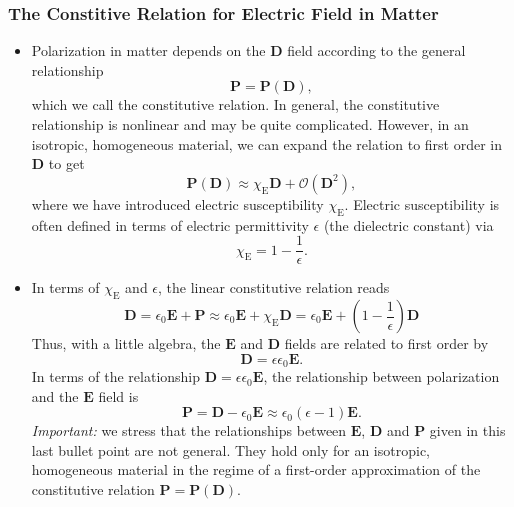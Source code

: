 \documentclass[11pt, a4paper]{article}
\renewcommand{\vec}[1]{\bm{#1}} %
\newcommand{\E}{\vec{E}} %
\newcommand{\D}{\vec{D}}  %
\renewcommand{\P}{\vec{P}}  %
\newcommand{\ee}{\epsilon_{0}}  %
\begin{document}
\subsubsection{The Constitive Relation for Electric Field in Matter}
\begin{itemize}
	\item Polarization in matter depends on the $ \D $ field according to the general relationship
	\begin{equation*}
		\P = \P(\D),
	\end{equation*}
	which we call the constitutive relation. In general, the constitutive relationship is nonlinear and may be quite complicated. However, in an isotropic, homogeneous material, we can expand the relation to first order in $ \D $ to get
	\begin{equation*}
		\P(\D) \approx \chi_{\text{E}} \D + \mathcal{O}(\D^{2}),
	\end{equation*}
    where we have introduced electric susceptibility $ \chi_{\text{E}} $. Electric susceptibility is often defined in terms of electric permittivity $ \epsilon $ (the dielectric constant) via
	\begin{equation*}
        \chi_{\text{E}} = 1 - \frac{1}{\epsilon}.
	\end{equation*}
	
	\item In terms of $ \chi_{\text{E}} $ and $ \epsilon $, the linear constitutive relation reads
	\begin{equation*}
        \D = \ee \E + \P \approx \ee \E + \chi_{\text{E}} \D = \ee \E + \left( 1 - \frac{1}{\epsilon} \right) \D 
	\end{equation*}
	Thus, with a little algebra, the $ \E $ and $ \D $ fields are related to first order by
	\begin{equation*}
        \D = \epsilon \ee \E.
	\end{equation*}
    In terms of the relationship $ \D = \epsilon \ee \E $, the relationship between polarization and the $ \E $ field is
	\begin{equation*}
        \P = \D - \ee \E \approx \ee (\epsilon - 1)\E.
	\end{equation*}
    \textit{Important:} we stress that the relationships between $ \E $, $ \D $ and $ \P $ given in this last bullet point are not general. They hold only for an isotropic, homogeneous material in the regime of a first-order approximation of the constitutive relation $ \P = \P(\D) $.
	
\end{itemize}
\end{document}
